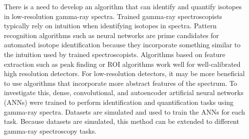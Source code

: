 There is a need to develop an algorithm that can identify and quantify isotopes in low-resolution gamma-ray spectra. Trained gamma-ray spectroscopists typically rely on intuition when identifying isotopes in spectra. Pattern recognition algorithms such as neural networks are prime candidates for automated isotope identification because they incorporate something similar to the intuition used by trained spectroscopists. Algorithms based on feature extraction such as peak finding or ROI algorithms work well for well-calibrated high resolution detectors. For low-resolution detectors, it may be more beneficial to use algorithms that incorporate more abstract features of the spectrum. To investigate this, dense, convolutional, and autoencoder artificial neural networks (ANNs) were trained to perform identification and quantification tasks using gamma-ray spectra. Datasets are simulated and used to train the ANNs for each task. Because datasets are simulated, this method can be extended to different gamma-ray spectroscopy tasks. %



